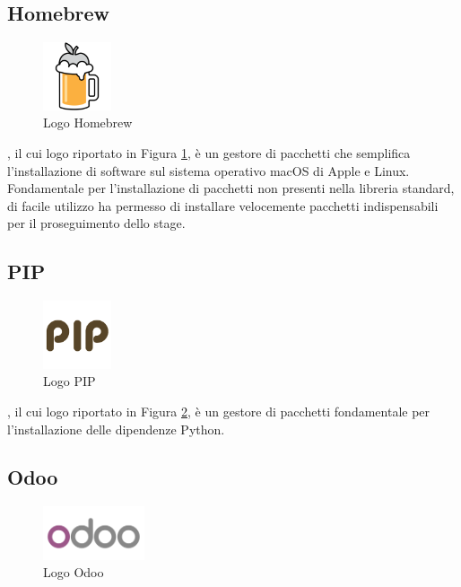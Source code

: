 \subsection{Homebrew}
\begin{figure}[H]
	\begin{center} \includegraphics[width=2cm]{figures/homebrew}
		\caption[Logo Homebrew]{Logo Homebrew}
		\label{logo_homebrew} 
	\end{center}
\end{figure}
, il cui logo riportato in Figura \ref{logo_homebrew}, è un gestore di pacchetti  che semplifica l'installazione di software sul sistema operativo macOS di Apple e Linux. Fondamentale per l'installazione di pacchetti non presenti nella libreria standard, di facile utilizzo ha permesso di installare velocemente pacchetti indispensabili per il proseguimento dello stage.


\subsection{PIP}
\begin{figure}[H]
	\begin{center} \includegraphics[width=2cm]{figures/pip}
		\caption[Logo Pip]{Logo PIP}
		\label{logo_pip} 
	\end{center}
\end{figure}
, il cui logo riportato in Figura \ref{logo_pip}, è un gestore di pacchetti fondamentale per l’installazione delle dipendenze Python.


\subsection{Odoo}
\begin{figure}[H]
	\begin{center} \includegraphics[width=3cm]{figures/logo_odoo}
		\caption[Logo Odoo]{Logo Odoo}
		\label{logo_odoo} 
	\end{center}
\end{figure}


